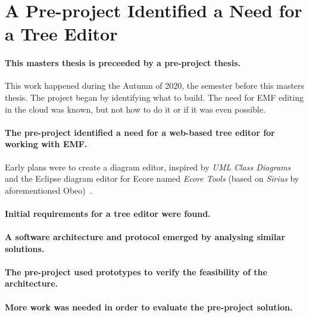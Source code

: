 \section{A Pre-project Identified a Need for a Tree Editor}

\paragraph{This masters thesis is preceeded by a pre-project thesis.}
This work happened during the Autumn of 2020, the semester before this masters thesis.
The project began by identifying what to build.
The need for \acrshort{EMF} editing in the \gls{cloud} was known, but not how to do it or if it was even possible.

\paragraph{The pre-project identified a need for a web-based tree editor for working with \acrshort{EMF}.}
Early plans were to create a diagram editor, inspired by \textit{\gls{UML} Class Diagrams} and the \gls{Eclipse} diagram editor for \gls{Ecore} named \textit{Ecore Tools} (based on \textit{Sirius} by aforementioned Obeo)~\cite{rekstadModelingEnvironmentCloud2020}.


\paragraph{Initial requirements for a tree editor were found.}

\paragraph{A software architecture and protocol emerged by analysing similar solutions.}

\paragraph{The pre-project used prototypes to verify the feasibility of the architecture.}

\paragraph{More work was needed in order to evaluate the pre-project solution.}

